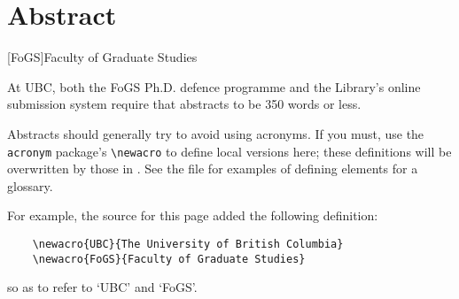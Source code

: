 \chapter{Abstract}

[FoGS]{Faculty of Graduate Studies}

At \ac{UBC}, both the \ac{FoGS} Ph.D. defence programme and the
Library's online submission system require that abstracts to be 350
words or less.

Abstracts should generally try to avoid using acronyms.  If you
must, use the \verb+acronym+ package's \verb+\newacro+ to define
local versions here; these definitions will be overwritten by those
in .  See the  file for
examples of defining elements for a glossary.

For example, the source for this page added the following definition:
\begin{verbatim}
    \newacro{UBC}{The University of British Columbia}
    \newacro{FoGS}{Faculty of Graduate Studies}
\end{verbatim}
so as to refer to `\ac{UBC}' and `\ac{FoGS}'.
